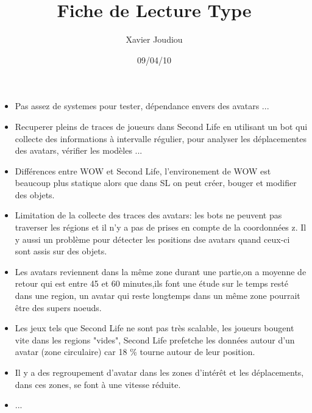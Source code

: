 \documentclass[11pt,a4paper]{article}
\title{Fiche de Lecture Type}
\author{Xavier Joudiou}
\date{09/04/10}
\begin{document}
	
  \begin{itemize}
  \renewcommand{\labelitemi}{$\Rightarrow$}
	\item Pas assez de systemes pour tester, dépendance envers des avatars ...
	\item Recuperer pleins de traces de joueurs dans Second Life en utilisant un bot qui collecte des informations à intervalle régulier, pour analyser les déplacementes des avatars, vérifier les modèles ...
	\item Différences entre WOW et Second Life, l'environement de WOW est beaucoup plus statique alors que dans SL on peut créer, bouger et modifier des objets.
	\item Limitation de la collecte des traces des avatars: les bots ne peuvent pas traverser les régions et il n'y a pas de prises en compte de la coordonnées z. Il y aussi un problème pour détecter les positions dse avatars quand ceux-ci sont assis sur des objets.
	\item Les avatars reviennent dans la même zone durant une partie,on a moyenne de retour qui est entre 45 et 60 minutes,ils font une étude sur le temps resté dans une region, un avatar qui reste longtemps dans un même zone  pourrait être des supers noeuds.
	\item Les jeux tels que Second Life ne sont pas très scalable, les joueurs bougent vite dans les regions "vides", Second Life prefetche les données autour d'un avatar (zone circulaire) car 18 \% tourne autour de leur position.
	\item Il y a des regroupement d'avatar dans les zones d'intérêt et les déplacements, dans ces zones, se font à une vitesse réduite.
	\item ...
  \end{itemize}
\end{document}
